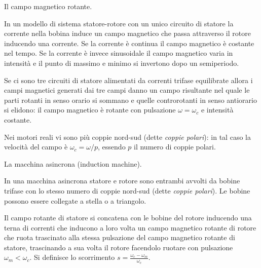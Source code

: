 \documentclass[answers, a4paper,12pt]{exam}
\begin{document}
\begin{questions}
\begin{solution}
	\end{solution}
	\question
	Il campo magnetico rotante.
	\begin{solution}In un modello di sistema statore-rotore con un unico circuito di statore la corrente nella bobina induce un campo magnetico che passa attraverso il rotore inducendo una corrente. Se la corrente è continua il campo magnetico è costante nel tempo. Se la corrente è invece sinusoidale il campo magnetico varia in intensità e il punto di massimo e minimo si invertono dopo un semiperiodo.  
		
		Se ci sono tre circuiti di statore alimentati da correnti trifase equilibrate allora i campi magnetici generati dai tre campi danno un campo risultante nel quale le parti rotanti in senso orario si sommano e quelle controrotanti in senso antiorario si elidono: il campo magnetico è rotante con pulsazione $\omega = \omega_c$ e intensità costante. 
		
		Nei motori reali vi sono più coppie nord-sud (dette \textit{coppie polari}): in tal caso la velocità del campo è $\omega_c = \omega / p$, essendo $p$ il numero di coppie polari. \end{solution}
	
	\question
	La macchina asincrona (induction machine).
	\begin{solution}In una macchina asincrona statore e rotore sono entrambi avvolti da bobine trifase con lo stesso numero di coppie nord-sud (dette \textit{coppie polari}). Le bobine possono essere collegate a stella o a triangolo. 
		
		Il campo rotante di statore si concatena con le bobine del rotore inducendo una terna di correnti che inducono a loro volta un campo magnetico rotante di rotore che ruota trascinato alla stessa pulsazione del campo magnetico rotante di statore, trascinando a sua volta il rotore facendolo ruotare con pulsazione $\omega_m < \omega_c$. 	Si definisce lo scorrimento $s = \frac{\omega_c - \omega_m}{\omega_c}$.
		

\end{solution}
\end{questions}
\end{document}
